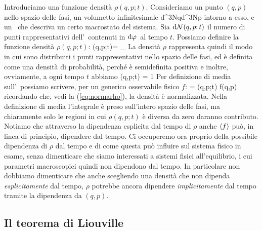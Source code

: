 Introduciamo una funzione densità $\rho(q,p;t)$. Consideriamo un punto $(q,p)$ nello spazio delle fasi, un volumetto infinitesimale
\be
\dephi \equiv \mbox{d}^{3N}q\;\mbox{d}^{3N}p
\ee
intorno a esso, e un \ensemble\ che descriva un certo macrostato del sistema. 
Sia ${\textrm d}{\mathcal N}(q,p;t)$ il numero di punti rappresentativi dell'\ensemble\ contenuti in ${\textrm d}\varphi\,$ al tempo $t$.
Possiamo definire la funzione densità $\rho(q,p;t)$:
\be
\rho(q,p;t)\dephi = \lim_{\calN\to\infty}
\ee
La densità $\rho$ rappresenta quindi il modo in cui sono distribuiti i punti rappresentativi nello spazio delle fasi, ed è definita come una densità di probabilità, perché è semidefinita positiva e inoltre, ovviamente, a ogni tempo $t$ abbiamo
\be
\label{eq:normarho}
\int\dephi\rho(q,p;t) = 1
\ee
Per definizione di media sull'\ensemble\ possiamo scrivere, per un generico osservabile fisico $f$:
\be
{} = \int\dephi \rho(q,p;t) f(q,p)
\ee
ricordando che, vedi la (\ref{eq:normarho}), la densità è normalizzata.
Nella definizione di media l'integrale è preso sull'intero spazio delle fasi, ma chiaramente solo le regioni in cui $\rho(q,p;t)$ è diversa da zero daranno contributo. Notiamo che attraverso la dipendenza esplicita dal tempo di $\rho$ anche $\langle f\rangle$ può, in linea di principio, dipendere dal tempo. Ci occuperemo ora proprio della possibile dipendenza di $\rho$ dal tempo e di come questa può influire sul sistema fisico in esame, senza dimenticare che siamo interessati a sistemi fisici all'equilibrio, i cui parametri macroscopici quindi non dipendono dal tempo. In particolare non dobbiamo dimenticare che anche scegliendo una densità che non dipenda {\em esplicitamente} dal tempo, $\rho$ potrebbe ancora dipendere {\em implicitamente} dal tempo tramite la dipendenza da $(q,p)$.

\subsection{Il teorema di Liouville}


